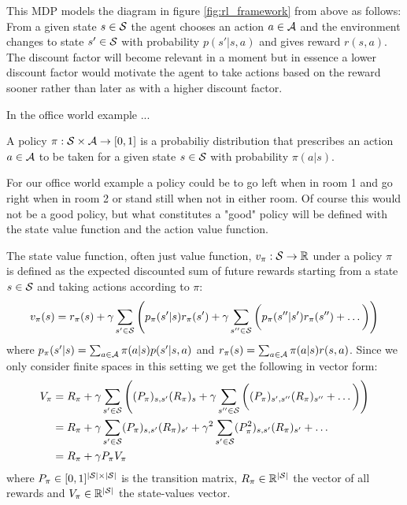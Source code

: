 This MDP models the diagram in figure \ref{fig:rl_framework} from above as follows: From a given state $s \in \S$ the agent chooses an action $a \in \A$ and the environment changes to state $s' \in \S$ with probability $p(s' | s, a)$ and gives reward $r(s, a)$. The discount factor will become relevant in a moment but in essence a lower discount factor would motivate the agent to take actions based on the reward sooner rather than later as with a higher discount factor.

In the office world example ... 


\begin{definition}
    \label{def:policy}
    A policy $\pi: \S \times \A \to [0,1]$ is a probabiliy distribution that prescribes an action $a \in \A$ to be taken for a given state $s \in \S$ with probability $\pi(a | s)$.
\end{definition}

For our office world example a policy could be to go left when in room 1 and go right when in room 2 or stand still when not in either room. Of course this would not be a good policy, but what constitutes a "good" policy will be defined with the state value function and the action value function.

\begin{definition}
    \label{def:value}
    The state value function, often just value function, $v_\pi: \S \to \R$ under a policy $\pi$ is defined as the expected discounted sum of future rewards starting from a state $s \in \S$ and taking actions according to $\pi$:
    $$v_\pi(s) = r_\pi(s) + \gamma \sum_{s' \in \S} \left( p_\pi(s' | s) r_\pi(s') + \gamma \sum_{s'' \in \S} \bigg( p_\pi(s'' | s') r_\pi(s'') + \dots \bigg) \right)$$
    where $p_\pi(s' | s) = \sum_{a \in \A} \pi(a | s) p(s' | s, a)$ and $r_\pi(s) = \sum_{a \in \A} \pi(a | s) r(s, a)$.
    Since we only consider finite spaces in this setting we get the following in vector form:
    \begin{align*}
        V_\pi & = R_\pi + \gamma \sum_{s' \in \S}\left( (P_\pi)_{s,s'} (R_\pi)_s + \gamma \sum_{s'' \in \S} \bigg( (P_\pi)_{s',s''} (R_\pi)_{s''} + \dots \bigg) \right) \\
              & = R_\pi + \gamma \sum_{s' \in \S} (P_\pi)_{s,s'} (R_\pi)_{s'} + \gamma^2 \sum_{s' \in \S} (P_\pi^2)_{s,s'} (R_\pi)_{s'} + \dots                          \\
              & = R_\pi + \gamma P_\pi V_\pi
    \end{align*}
    where $P_\pi \in [0,1]^{|\S| \times |\S|}$ is the transition matrix, $R_\pi \in \R^{|\S|}$ the vector of all rewards and $V_\pi \in \R^{|\S|}$ the state-values vector.
\end{definition}

